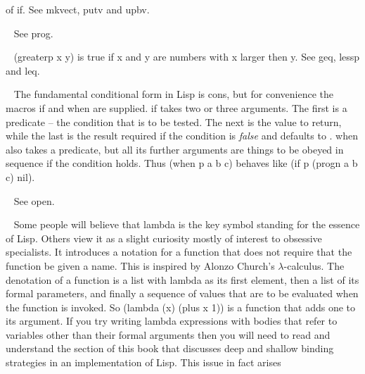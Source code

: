 \begin{description}
of if. See {\tx mkvect}, {\tx putv} and {\tx upbv}.
\item[{\tx go~~~~~~~~~~~} \hspace{1cm} {\em special form}]~\newline
See {\tx prog}.
\item[{\tx greaterp~~~~~} \hspace{1cm} {\em function 2 args}]~\newline
{\tx (greaterp x y)} is true if {\tx x} and {\tx y} are numbers with
{\tx x} larger then {\tx y}. See {\tx geq}, {\tx lessp} and {\tx leq}.
\item[{\tx if~~~~~~~~~~~} \hspace{1cm} {\em macro}]~\newline
The fundamental conditional form in Lisp is {\tx cons}, but for convenience
the macros {\tx if} and {\tx when} are supplied. {\tx if} takes two
or three arguments. The first is a predicate -- the condition that
is to be tested. The next is the value to return, while the last is the
result required if the condition is {\em false} and defaults to \nil.
{\tx when} also takes a predicate, but all its further arguments are things
to be obeyed in sequence if the condition holds. Thus
{\tx (when p a b c)} behaves like {\tx (if p (progn a b c) nil)}.
\item[{\tx input~~~~~~~~} \hspace{1cm} {\em symbol}]~\newline
See {\tx open}.
\item[{\tx lambda~~~~~~~} \hspace{1cm} {\em symbol}]~\newline
Some people will believe that {\tx lambda} is the key symbol standing for the
essence of Lisp. Others view it as a slight curiosity mostly of interest
to obsessive specialists. It introduces a notation for a function that does
not require that the function be given a name. This is inspired by
Alonzo Church's $\lambda$-calculus. The denotation of a function is a list
with {\tx lambda} as its first element, then a list of its formal parameters,
and finally a sequence of values that are to be evaluated when the function
is invoked. So {\tx (lambda (x) (plus x 1))} is a function that adds one to
its argument. If you try writing lambda expressions with bodies that refer to
variables other than their formal arguments then you will need to read
and understand the section of this book that discusses deep and shallow
binding strategies in an implementation of Lisp. This issue in fact arises

\end{description}
